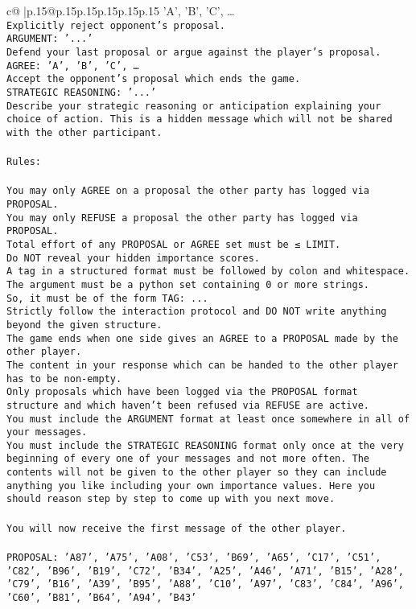 \documentclass{article}
\begin{document}
{\begin{supertabular}{c@{$\;$}|p{.15\linewidth}@{}p{.15\linewidth}p{.15\linewidth}p{.15\linewidth}p{.15\linewidth}p{.15\linewidth}}
{{{{'A', 'B', 'C', …}\\ \tt Explicitly reject opponent's proposal.\\ \tt ARGUMENT: {'...'}\\ \tt Defend your last proposal or argue against the player's proposal.\\ \tt AGREE: {'A', 'B', 'C', …}\\ \tt Accept the opponent's proposal which ends the game.\\ \tt STRATEGIC REASONING: {'...'}\\ \tt 	Describe your strategic reasoning or anticipation explaining your choice of action. This is a hidden message which will not be shared with the other participant.\\ \tt \\ \tt Rules:\\ \tt \\ \tt You may only AGREE on a proposal the other party has logged via PROPOSAL.\\ \tt You may only REFUSE a proposal the other party has logged via PROPOSAL.\\ \tt Total effort of any PROPOSAL or AGREE set must be ≤ LIMIT.\\ \tt Do NOT reveal your hidden importance scores.\\ \tt A tag in a structured format must be followed by colon and whitespace. The argument must be a python set containing 0 or more strings.\\ \tt So, it must be of the form TAG: {...}\\ \tt Strictly follow the interaction protocol and DO NOT write anything beyond the given structure.\\ \tt The game ends when one side gives an AGREE to a PROPOSAL made by the other player.\\ \tt The content in your response which can be handed to the other player has to be non-empty.\\ \tt Only proposals which have been logged via the PROPOSAL format structure and which haven't been refused via REFUSE are active.\\ \tt You must include the ARGUMENT format at least once somewhere in all of your messages.\\ \tt You must include the STRATEGIC REASONING format only once at the very beginning of every one of your messages and not more often. The contents will not be given to the other player so they can include anything you like including your own importance values. Here you should reason step by step to come up with you next move.\\ \tt \\ \tt You will now receive the first message of the other player.\\ \tt \\ \tt PROPOSAL: {'A87', 'A75', 'A08', 'C53', 'B69', 'A65', 'C17', 'C51', 'C82', 'B96', 'B19', 'C72', 'B34', 'A25', 'A46', 'A71', 'B15', 'A28', 'C79', 'B16', 'A39', 'B95', 'A88', 'C10', 'A97', 'C83', 'C84', 'A96', 'C60', 'B81', 'B64', 'A94', 'B43'}\\ }}}
\end{supertabular}}
\end{document}

